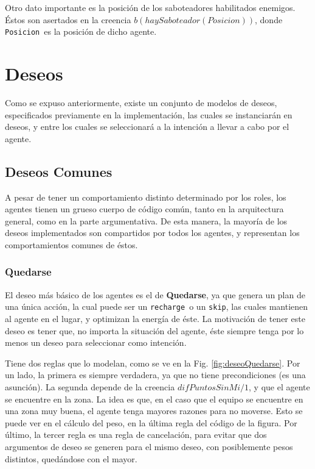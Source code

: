 \documentclass[oneside]{book}
\theoremstyle{definition}
\newcommand{\lit}[1]{\mbox{$ #1$}}
\begin{document}
Otro dato importante es la posición de los saboteadores habilitados enemigos.
Éstos son asertados en la creencia \lit{b(haySaboteador(Posicion))}, donde 
\texttt{Posicion}\ es la posición de dicho agente.

\section{Deseos}

Como se expuso anteriormente, existe un conjunto de modelos de deseos, especificados
previamente en la implementación, las cuales se instanciarán en deseos, y entre los 
cuales se seleccionará a la intención a llevar a cabo por el agente.

\subsection{Deseos Comunes}

\label{sec:deseosComunes}

A pesar de tener un comportamiento distinto determinado por los roles, los agentes
tienen un grueso cuerpo de código común, tanto en la arquitectura general, como 
en la parte argumentativa. De esta manera, la mayoría de los deseos implementados son
compartidos por todos los agentes, y representan los comportamientos comunes de éstos.

\subsubsection{Quedarse}

El deseo más básico de los agentes es el de \textbf{Quedarse}, ya que genera un plan de 
una única acción, la cual puede ser un \texttt{recharge}\ o un \texttt{skip}, las cuales
mantienen al agente en el lugar, y optimizan la energía de éste. La 
motivación de tener este deseo es tener que, no importa la situación del agente, éste
siempre tenga por lo menos un deseo para seleccionar como intención.

Tiene dos reglas que lo modelan, como se ve en la Fig. \ref{fig:deseoQuedarse}. Por un
lado, la primera es siempre verdadera, ya que no tiene precondiciones (es una asunción).
La segunda depende de la creencia \lit{difPuntosSinMi/1}, y que el agente se encuentre
en la zona. La idea es que, en el caso que el equipo se encuentre en una zona muy buena,
el agente tenga mayores razones para no moverse. Esto se puede ver en el cálculo del 
peso, en la última regla del código de la figura. Por último, la tercer regla es una
regla de cancelación, para evitar que dos argumentos de deseo se generen para el mismo
deseo, con posiblemente pesos distintos, quedándose con el mayor.
\end{document}

